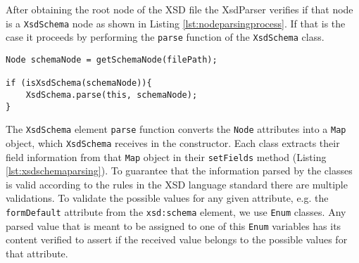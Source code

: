 \newpage

\noindent
After obtaining the root node of the \ac{XSD} file the XsdParser verifies if that node is a \texttt{XsdSchema} node as shown in Listing \ref{lst:nodeparsingprocess}. If that is the case it proceeds by performing the \texttt{parse} function of the \texttt{XsdSchema} class.  

\bigskip


\begin{minipage}{\linewidth}
\begin{lstlisting}[caption={XsdParser Parsing the XsdSchema Node which triggers the parsing of the whole XSD document},captionpos=b,label={lst:nodeparsingprocess}]
Node schemaNode = getSchemaNode(filePath);
            
if (isXsdSchema(schemaNode)){
    XsdSchema.parse(this, schemaNode);
}
\end{lstlisting}
\end{minipage}

\noindent
The \texttt{XsdSchema} element \texttt{parse} function converts the \texttt{Node} attributes into a \texttt{Map} object, which \texttt{XsdSchema} receives in the constructor. Each class extracts their field information from that \texttt{Map} object in their \texttt{setFields} method (Listing \ref{lst:xsdschemaparsing}). To guarantee that the information parsed by the classes is valid according to the rules in the \ac{XSD} language standard there are multiple validations. To validate the possible values for any given attribute, e.g. the \texttt{formDefault} attribute from the \texttt{xsd:schema} element, we use \texttt{Enum} classes. Any parsed value that is meant to be assigned to one of this \texttt{Enum} variables has its content verified to assert if the received value belongs to the possible values for that attribute. 

\bigskip


